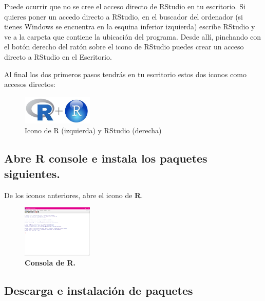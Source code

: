 \documentclass[
  letterpaper,
  DIV=11,
  numbers=noendperiod]{scrartcl}
\begin{document}
Puede ocurrir que no se cree el acceso directo de RStudio en tu
escritorio. Si quieres poner un accedo directo a RStudio, en el buscador
del ordenador (si tienes Windows se encuentra en la esquina inferior
izquierda) escribe RStudio y ve a la carpeta que contiene la ubicación
del programa. Desde allí, pinchando con el botón derecho del ratón sobre
el icono de RStudio puedes crear un acceso directo a RStudio en el
Escritorio.

Al final los dos primeros pasos tendrás en tu escritorio estos dos
iconos como accesos directos:

\begin{figure}[H]

{\centering \includegraphics[width=0.3\textwidth,height=\textheight]{img/r-rstudio-icons.png}

}

\caption{Icono de R (izquierda) y RStudio (derecha)}

\end{figure}%

\subsection{Abre R console e instala los paquetes
siguientes.}\label{abre-r-console-e-instala-los-paquetes-siguientes.}

De los iconos anteriores, abre el icono de \textbf{R}.

\begin{figure}[H]

{\centering \includegraphics[width=0.3\textwidth,height=\textheight]{img/r-console.png}

}

\caption{\textbf{Consola de R.}}

\end{figure}%

\subsection{Descarga e instalación de
paquetes}\label{descarga-e-instalaciuxf3n-de-paquetes}
\end{document}
